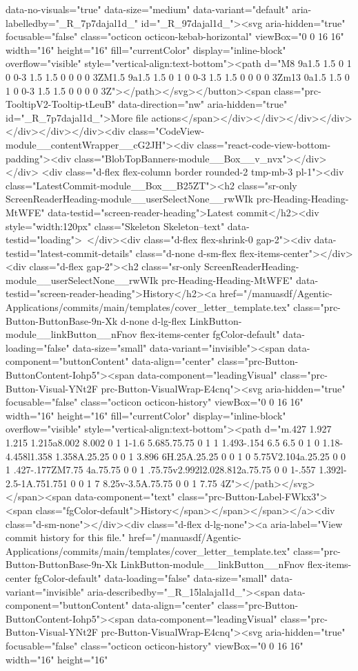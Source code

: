 {{{{{{{data-no-visuals="true" data-size="medium" data-variant="default" aria-labelledby="_R_7p7dajal1d_" id="_R_97dajal1d_"><svg aria-hidden="true" focusable="false" class="octicon octicon-kebab-horizontal" viewBox="0 0 16 16" width="16" height="16" fill="currentColor" display="inline-block" overflow="visible" style="vertical-align:text-bottom"><path d="M8 9a1.5 1.5 0 1 0 0-3 1.5 1.5 0 0 0 0 3ZM1.5 9a1.5 1.5 0 1 0 0-3 1.5 1.5 0 0 0 0 3Zm13 0a1.5 1.5 0 1 0 0-3 1.5 1.5 0 0 0 0 3Z"></path></svg></button><span class="prc-TooltipV2-Tooltip-tLeuB" data-direction="nw" aria-hidden="true" id="_R_7p7dajal1d_">More file actions</span></div></div></div></div></div></div></div><div class="CodeView-module__contentWrapper__cG2JH"><div class="react-code-view-bottom-padding"><div class="BlobTopBanners-module__Box__v_nvx"></div></div> <div class="d-flex flex-column border rounded-2 tmp-mb-3 pl-1"><div class="LatestCommit-module__Box__B25ZT"><h2 class="sr-only ScreenReaderHeading-module__userSelectNone__rwWIk prc-Heading-Heading-MtWFE" data-testid="screen-reader-heading">Latest commit</h2><div style="width:120px" class="Skeleton Skeleton--text" data-testid="loading"> </div><div class="d-flex flex-shrink-0 gap-2"><div data-testid="latest-commit-details" class="d-none d-sm-flex flex-items-center"></div><div class="d-flex gap-2"><h2 class="sr-only ScreenReaderHeading-module__userSelectNone__rwWIk prc-Heading-Heading-MtWFE" data-testid="screen-reader-heading">History</h2><a href="/manuasdf/Agentic-Applications/commits/main/templates/cover_letter_template.tex" class="prc-Button-ButtonBase-9n-Xk d-none d-lg-flex LinkButton-module__linkButton__nFnov flex-items-center fgColor-default" data-loading="false" data-size="small" data-variant="invisible"><span data-component="buttonContent" data-align="center" class="prc-Button-ButtonContent-Iohp5"><span data-component="leadingVisual" class="prc-Button-Visual-YNt2F prc-Button-VisualWrap-E4cnq"><svg aria-hidden="true" focusable="false" class="octicon octicon-history" viewBox="0 0 16 16" width="16" height="16" fill="currentColor" display="inline-block" overflow="visible" style="vertical-align:text-bottom"><path d="m.427 1.927 1.215 1.215a8.002 8.002 0 1 1-1.6 5.685.75.75 0 1 1 1.493-.154 6.5 6.5 0 1 0 1.18-4.458l1.358 1.358A.25.25 0 0 1 3.896 6H.25A.25.25 0 0 1 0 5.75V2.104a.25.25 0 0 1 .427-.177ZM7.75 4a.75.75 0 0 1 .75.75v2.992l2.028.812a.75.75 0 0 1-.557 1.392l-2.5-1A.751.751 0 0 1 7 8.25v-3.5A.75.75 0 0 1 7.75 4Z"></path></svg></span><span data-component="text" class="prc-Button-Label-FWkx3"><span class="fgColor-default">History</span></span></span></a><div class="d-sm-none"></div><div class="d-flex d-lg-none"><a aria-label="View commit history for this file." href="/manuasdf/Agentic-Applications/commits/main/templates/cover_letter_template.tex" class="prc-Button-ButtonBase-9n-Xk LinkButton-module__linkButton__nFnov flex-items-center fgColor-default" data-loading="false" data-size="small" data-variant="invisible" aria-describedby="_R_15lalajal1d_"><span data-component="buttonContent" data-align="center" class="prc-Button-ButtonContent-Iohp5"><span data-component="leadingVisual" class="prc-Button-Visual-YNt2F prc-Button-VisualWrap-E4cnq"><svg aria-hidden="true" focusable="false" class="octicon octicon-history" viewBox="0 0 16 16" width="16" height="16" }}}}}}}
